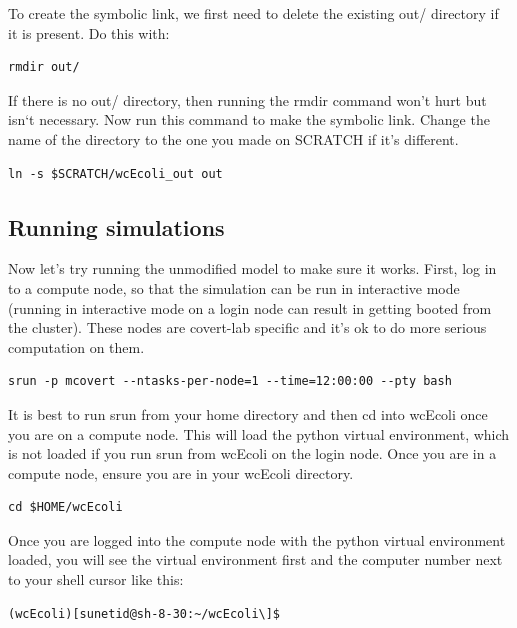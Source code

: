 \documentclass[12pt]{article}
\begin{document}
To create the symbolic link, we first need to delete the existing out/ directory if it is present. Do this with:

\lstset{language=bash}
\begin{lstlisting}
rmdir out/
\end{lstlisting}

If there is no out/ directory, then running the rmdir command won't hurt but isn`t necessary. Now run this command to make the symbolic link. Change the name of the directory to the one you made on SCRATCH if it's different.

\lstset{language=bash}
\begin{lstlisting}
ln -s $SCRATCH/wcEcoli_out out
\end{lstlisting}

\subsection{Running simulations}

Now let's try running the unmodified model to make sure it works. First, log in to a compute node, so that the simulation can be run in interactive mode (running in interactive mode on a login node can result in getting booted from the cluster). These nodes are covert-lab specific and it's ok to do more serious computation on them.

\begin{lstlisting}
srun -p mcovert --ntasks-per-node=1 --time=12:00:00 --pty bash
\end{lstlisting}

It is best to run srun from your home directory and then cd into wcEcoli once you are on a compute node. This will load the python virtual environment, which is not loaded if you run srun from wcEcoli on the login node. Once you are in a compute node, ensure you are in your wcEcoli directory.

\begin{lstlisting}
cd $HOME/wcEcoli
\end{lstlisting}

Once you are logged into the compute node with the python virtual environment loaded, you will see the virtual environment first and the computer number next to your shell cursor like this:

\lstset{language=bash}
\begin{lstlisting}
(wcEcoli)[sunetid@sh-8-30:~/wcEcoli\]$
\end{lstlisting}
\end{document}
